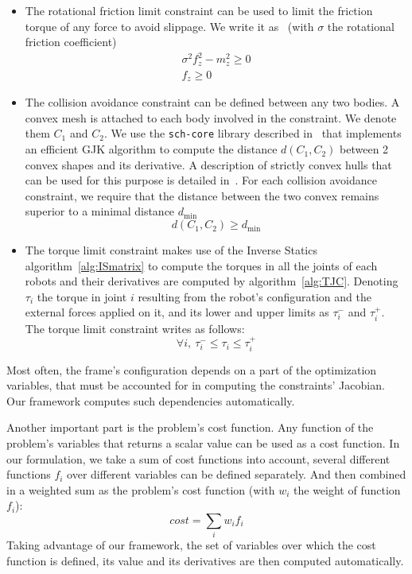 \begin{itemize}
\item The rotational friction limit constraint can be used to limit the friction torque of any force to avoid slippage.
We write it as~ (with $\sigma$ the rotational friction coefficient)
\begin{equation}
  \begin{split}
    \sigma^2f_z^2-m_z^2 \geq 0 \\
    f_z \geq 0
  \end{split}
  \label{eq:frictionTorque}
\end{equation}


\item The collision avoidance constraint can be defined between any two bodies.
A convex mesh is attached to each body involved in the constraint.
We denote them $C_1$ and $C_2$.
We use the {\tt sch-core} library described in~\cite{benallegue:icra:2009} that implements an efficient GJK algorithm to compute the distance $d(C_1,C_2)$ between 2 convex shapes and its derivative.
A description of strictly convex hulls that can be used for this purpose is detailed in~\cite{escande:itro:2014}.
For each collision avoidance constraint, we require that the distance between the two convex remains superior to a minimal distance $d_{\min}$
\begin{equation}
  d(C_1, C_2)\geq d_{\min}
\end{equation}

\item The torque limit constraint makes use of the Inverse Statics algorithm~\ref{alg:ISmatrix} to compute the torques in all the joints of each robots and their derivatives are computed by algorithm~\ref{alg:TJC}.
Denoting $\tau_i$ the torque in joint $i$ resulting from the robot's configuration and the external forces applied on it, and its lower and upper limits as $\tau_i^-$ and $\tau_i^+$. The torque limit constraint writes as follows:
\begin{equation}
  \forall i,\ \tau_i^- \leq \tau_i \leq \tau_i^+
\end{equation}
\end{itemize}


Most often, the frame's configuration depends on a part of the optimization variables, that must be accounted for in computing the constraints' Jacobian.
Our framework computes such dependencies automatically.

Another important part is the problem's cost function.
Any function of the problem's variables that returns a scalar value can be used as a cost function.
In our formulation, we take a sum of cost functions into account, several different functions $f_i$ over different variables can be defined separately.
And then combined in a weighted sum as the problem's cost function (with $w_i$ the weight of function $f_i$):
\begin{equation}
  cost = \sum\limits_i w_i f_i
\end{equation}
Taking advantage of our framework, the set of variables over which the cost function is defined, its value and its derivatives are then computed automatically.

